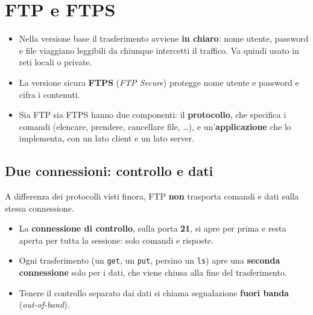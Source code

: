 \section{FTP e FTPS}


\begin{itemize}
    \item Nella versione base il trasferimento avviene \textbf{in chiaro}: nome utente, password e file
          viaggiano leggibili da chiunque intercetti il traffico. Va quindi usato in reti locali o private.
    \item La versione sicura \textbf{FTPS} (\emph{FTP Secure}) protegge nome utente e password e cifra i contenuti.
    \item Sia FTP sia FTPS hanno due componenti: il \textbf{protocollo}, che specifica i comandi (elencare,
          prendere, cancellare file, \dots), e un'\textbf{applicazione} che lo implementa, con un lato client e
          un lato server.
\end{itemize}

\subsection{Due connessioni: controllo e dati}

A differenza dei protocolli visti finora, FTP \textbf{non} trasporta comandi e dati sulla stessa connessione.
\begin{itemize}
    \item La \textbf{connessione di controllo}, sulla porta \textbf{21}, si apre per prima e resta aperta per tutta
          la sessione: solo comandi e risposte.
    \item Ogni trasferimento (un \texttt{get}, un \texttt{put}, persino un \texttt{ls}) apre una \textbf{seconda
          connessione} solo per i dati, che viene chiusa alla fine del trasferimento.
    \item Tenere il controllo separato dai dati si chiama segnalazione \textbf{fuori banda} (\emph{out-of-band}).
\end{itemize}

